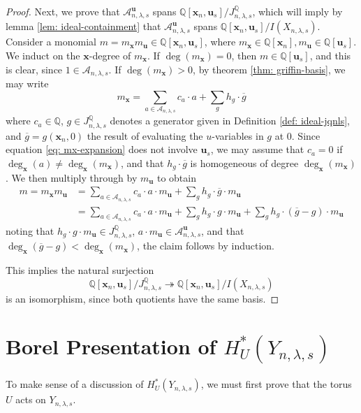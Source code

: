 \documentclass[11pt]{amsart}
\numberwithin{equation}{section}
\theoremstyle{definition}
\newcommand{\AAA}{{\mathcal{A}}}
\newcommand{\QQ}{{\mathbb{Q}}}
\newcommand{\xxx}{{\mathbf{x}}}
\newcommand{\uuu}{{\mathbf{u}}}
\begin{document}
\begin{proof}
    Next, we prove that $\AAA^\uuu_{n,\lambda,s}$ spans $\QQ[\xxx_n,\uuu_s]/J^\QQ_{n,\lambda,s}$, which will imply by lemma \ref{lem: ideal-containment} that $\AAA^\uuu_{n,\lambda,s}$ spans $\QQ[\xxx_n,\uuu_s]/I(X_{n,\lambda,s})$. Consider a monomial $m = m_\xxx m_\uuu \in \QQ[\xxx_n,\uuu_s]$, where $m_\xxx \in \QQ[\xxx_n], m_\uuu \in \QQ[\uuu_s]$. We induct on the $\xxx$-degree of $m_\xxx$.
    If $\deg(m_\xxx) = 0$, then $m \in \QQ[\uuu_s]$, and this is clear, since $1 \in \AAA_{n,\lambda,s}$. If $\deg(m_\xxx) > 0$, by theorem \ref{thm: griffin-basis}, we may write
    \begin{equation}\label{eq: mx-expansion}
        m_\xxx = \sum_{a \in \AAA_{n,\lambda,s}} c_a \cdot a + \sum_{g} h_g \cdot \overline{g}
    \end{equation}
    where $c_a \in \QQ$, $g \in J^\QQ_{n,\lambda,s}$ denotes a generator given in Definition \ref{def: ideal-jqnls}, and $\overline{g} =g(\xxx_n,0)$ the result of evaluating the $u$-variables in $g$ at $0$. Since equation \ref{eq: mx-expansion} does not involve $\uuu_s$, we may assume that $c_a = 0$ if $\deg_\xxx(a) \neq \deg_\xxx(m_\xxx)$, and that $h_g \cdot \overline{g}$ is homogeneous of degree $\deg_\xxx(m_\xxx)$. We then multiply through by $m_\uuu$ to obtain
    \begin{align}
    m = m_\xxx m_\uuu & = \sum_{a \in \AAA_{n,\lambda,s}} c_a \cdot a \cdot m_\uuu + \sum_{g} h_g \cdot \overline{g} \cdot m_\uuu \\
    & = \sum_{a \in \AAA_{n,\lambda,s}} c_a \cdot a \cdot m_\uuu + \sum_{g} h_g \cdot g \cdot m_\uuu + \sum_{g} h_g \cdot (\overline{g} - g) \cdot m_\uuu
    \end{align}
    noting that $h_g \cdot g \cdot m_\uuu \in J^\QQ_{n,\lambda,s}$, $ a \cdot m_\uuu \in \AAA^\uuu_{n,\lambda,s}$, and that $\deg_\xxx(\overline{g} - g) < \deg_\xxx(m_\xxx)$, the claim follows by induction.

    This implies the natural surjection
    \[
    \QQ[\xxx_n,\uuu_s]/J_{n,\lambda,s}^\QQ \twoheadrightarrow \QQ[\xxx_n,\uuu_s]/I(X_{n,\lambda,s})
    \]
    is an isomorphism, since both quotients have the same basis.
\end{proof}

\section{Borel Presentation of $H^*_U(Y_{n,\lambda,s})$}\label{sec:geometry}

To make sense of a discussion of $H^*_U(Y_{n,\lambda,s})$, we must first prove that the torus $U$ acts on $Y_{n,\lambda,s}$.
\end{document}
